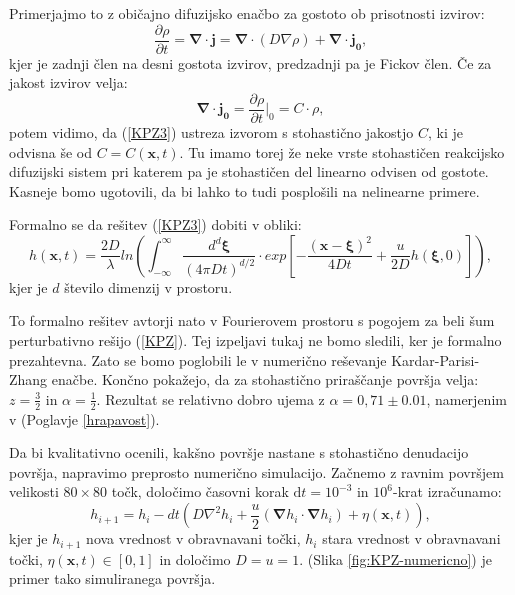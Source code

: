 \documentclass[a4paper, twoside, 12pt]{book}
\begin{document}
Primerjajmo to z običajno difuzijsko enačbo za gostoto ob prisotnosti izvirov:
\begin{equation}
  \frac{ \partial \rho}{ \partial t} = \boldsymbol\nabla \cdot \mathbf{j} = \boldsymbol\nabla \cdot (D \nabla \rho) + \boldsymbol\nabla \cdot \mathbf{j_0},
  \label{dinamicna-splosna-3}
\end{equation}
kjer je zadnji člen na desni gostota izvirov, predzadnji pa je Fickov člen. Če za jakost izvirov velja:
\begin{equation}
  \boldsymbol \nabla \cdot \mathbf{j_0} = \frac{\partial \rho}{\partial t}\bigg|_{0} = C \cdot \rho,
  \label{jakost-izvirov}
\end{equation}
potem vidimo, da (\ref{KPZ3}) ustreza izvorom s stohastično jakostjo $C$, ki je odvisna še od $C=C(\mathbf{x},t)$. Tu imamo torej že neke vrste stohastičen reakcijsko difuzijski sistem pri katerem pa je stohastičen del linearno odvisen od gostote. Kasneje bomo ugotovili, da bi lahko to tudi posplošili na nelinearne primere.

Formalno se da rešitev (\ref{KPZ3}) dobiti v obliki:
\begin{equation}
  h(\mathbf{x},t) = \frac{2 D}{\lambda} ln \left( \int_{-\infty}^{\infty} \frac{d^d \boldsymbol\xi}{(4 \pi D t)^{d/2}} \cdot exp \left[-\frac{(\mathbf{x}-\boldsymbol\xi)^2}{4 D t} + \frac{u}{2 D}h(\boldsymbol\xi,0) \right] \right),
\end{equation}
kjer je $d$ število dimenzij v prostoru.

    To formalno rešitev avtorji \cite{kardar1986dynamic} nato v Fourierovem prostoru s pogojem za beli šum perturbativno rešijo (\ref{KPZ}). Tej izpeljavi tukaj ne bomo sledili, ker je formalno prezahtevna. Zato se bomo poglobili le v numerično reševanje Kardar-Parisi-Zhang enačbe. Končno pokažejo, da za stohastično priraščanje površja velja: $z = \frac{3}{2}$ in $\alpha=\frac{1}{2}$. Rezultat se relativno dobro ujema z $\alpha =  0,71 \pm 0.01$, namerjenim v (Poglavje \ref{hrapavost}).

Da bi kvalitativno ocenili, kakšno površje nastane s stohastično denudacijo površja, napravimo preprosto numerično simulacijo. Začnemo z ravnim površjem velikosti $80\times80$ točk, določimo časovni korak $\mathrm{d}t=10^{-3}$ in $10^6$-krat izračunamo:
\begin{equation} 
  h_{i+1} = h_i - dt (D \nabla^2 h_i + \frac{u}{2} (\boldsymbol\nabla h_i \cdot \boldsymbol\nabla h_i) + \eta (\mathbf{x},t)),
\end{equation}
kjer je $h_{i+1}$ nova vrednost v obravnavani točki, $h_{i}$ stara vrednost v obravnavani točki, $\eta (\mathbf{x},t) \in [0,1]$ in določimo $D = u = 1$. (Slika \ref{fig:KPZ-numericno}) je primer tako simuliranega površja.
\end{document}
